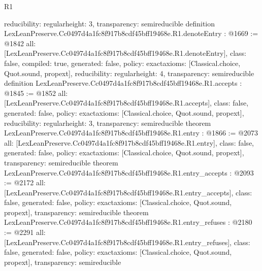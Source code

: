 \begin{lexlean}{R1}
\begin{coremodule}
{  reducibility: regular{height: 3},
  transparency: semireducible
}
definition LexLeanPreserve.Cc0497d4a1fc8f917b8cdf45bff19468e.R1.denoteEntry : @1669 := @1842 {
  all: [LexLeanPreserve.Cc0497d4a1fc8f917b8cdf45bff19468e.R1.denoteEntry],
  class: false,
  compiled: true,
  generated: false,
  policy: exact{axioms: [Classical.choice, Quot.sound, propext]},
  reducibility: regular{height: 4},
  transparency: semireducible
}
definition LexLeanPreserve.Cc0497d4a1fc8f917b8cdf45bff19468e.R1.accepts : @1845 := @1852 {
  all: [LexLeanPreserve.Cc0497d4a1fc8f917b8cdf45bff19468e.R1.accepts],
  class: false,
  generated: false,
  policy: exact{axioms: [Classical.choice, Quot.sound, propext]},
  reducibility: regular{height: 3},
  transparency: semireducible
}
theorem LexLeanPreserve.Cc0497d4a1fc8f917b8cdf45bff19468e.R1.entry : @1866 := @2073 {
  all: [LexLeanPreserve.Cc0497d4a1fc8f917b8cdf45bff19468e.R1.entry],
  class: false,
  generated: false,
  policy: exact{axioms: [Classical.choice, Quot.sound, propext]},
  transparency: semireducible
}
theorem LexLeanPreserve.Cc0497d4a1fc8f917b8cdf45bff19468e.R1.entry_accepts : @2093 := @2172 {
  all: [LexLeanPreserve.Cc0497d4a1fc8f917b8cdf45bff19468e.R1.entry_accepts],
  class: false,
  generated: false,
  policy: exact{axioms: [Classical.choice, Quot.sound, propext]},
  transparency: semireducible
}
theorem LexLeanPreserve.Cc0497d4a1fc8f917b8cdf45bff19468e.R1.entry_refuses : @2180 := @2291 {
  all: [LexLeanPreserve.Cc0497d4a1fc8f917b8cdf45bff19468e.R1.entry_refuses],
  class: false,
  generated: false,
  policy: exact{axioms: [Classical.choice, Quot.sound, propext]},
  transparency: semireducible
}


\end{coremodule}
\end{lexlean}
